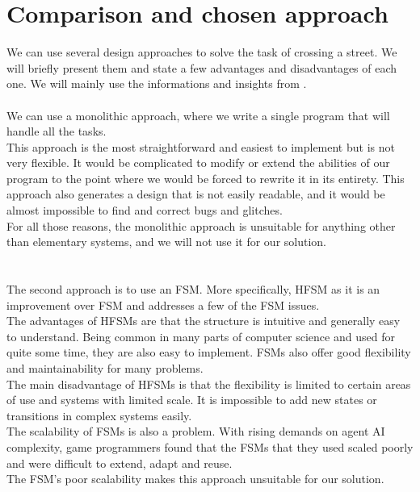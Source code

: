\section{Comparison and chosen approach}
    We can use several design approaches to solve the task of crossing a street. We will briefly present them and state a few advantages and disadvantages of each one. We will mainly use the informations and insights from \cite{BT_intro}.\\
    \\
        We can use a monolithic approach, where we write a single program that will handle all the tasks.\\
        This approach is the most straightforward and easiest to implement but is not very flexible. It would be complicated to modify or extend the abilities of our program to the point where we would be forced to rewrite it in its entirety. This approach also generates a design that is not easily readable, and it would be almost impossible to find and correct bugs and glitches.\\
        For all those reasons, the monolithic approach is unsuitable for anything other than elementary systems, and we will not use it for our solution.\\\\
    \\
        The second approach is to use an FSM. More specifically, HFSM as it is an improvement over FSM and addresses a few of the FSM issues.\\
        The advantages of HFSMs are that the structure is intuitive and generally easy to understand. Being common in many parts of computer science and used for quite some time, they are also easy to implement. FSMs also offer good flexibility and maintainability for many problems.\\
        The main disadvantage of HFSMs is that the flexibility is limited to certain areas of use and systems with limited scale. It is impossible to add new states or transitions in complex systems easily.\\
        The scalability of FSMs is also a problem. With rising demands on agent AI complexity, game programmers found that the FSMs that they used scaled poorly and were difficult to extend, adapt and reuse.\cite{BT_survey}\\
        The FSM's poor scalability makes this approach unsuitable for our solution.\\\\
